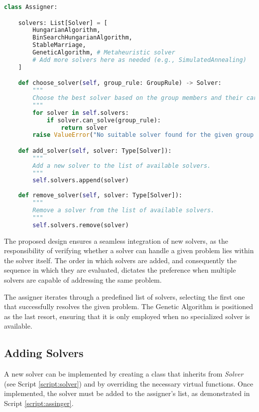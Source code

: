     \begin{lstlisting}[language=Python, caption={Assigner Class.}, label={script:assinger}]
class Assigner:

    solvers: List[Solver] = [
        HungarianAlgorithm,
        BinSearchHungarianAlgorithm,
        StableMarriage,
        GeneticAlgorithm, # Metaheuristic solver
        # Add more solvers here as needed (e.g., SimulatedAnnealing)
    ]

    def choose_solver(self, group_rule: GroupRule) -> Solver:
        """
        Choose the best solver based on the group members and their cardinality.
        """
        for solver in self.solvers:
            if solver.can_solve(group_rule):
                return solver
        raise ValueError("No suitable solver found for the given group.")

    def add_solver(self, solver: Type[Solver]):
        """
        Add a new solver to the list of available solvers.
        """
        self.solvers.append(solver)
    
    def remove_solver(self, solver: Type[Solver]):
        """
        Remove a solver from the list of available solvers.
        """
        self.solvers.remove(solver)
\end{lstlisting}

            The proposed design ensures a seamless integration of new solvers, as the responsibility of verifying whether a solver can handle a given problem lies within the solver itself. The order in which solvers are added, and consequently the sequence in which they are evaluated, dictates the preference when multiple solvers are capable of addressing the same problem.

            The assigner iterates through a predefined list of solvers, selecting the first one that successfully resolves the given problem. The Genetic Algorithm is positioned as the last resort, ensuring that it is only employed when no specialized solver is available.

        \subsection{Adding Solvers}
            A new solver can be implemented by creating a class that inherits from \textit{Solver} (see Script \ref{script:solver}) and by overriding the necessary virtual functions.
            Once implemented, the solver must be added to the assigner's list, as demonstrated in Script \ref{script:assinger}.

